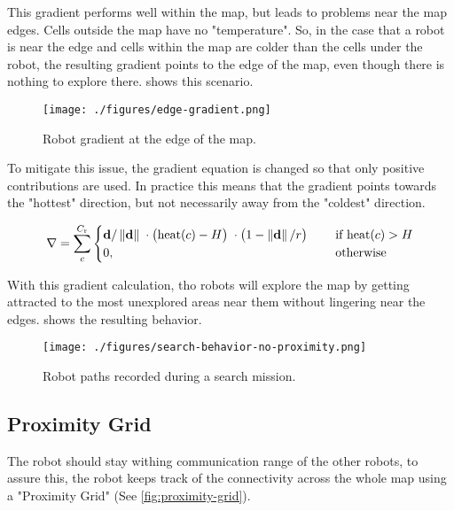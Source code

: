 This gradient performs well within the map, but leads to problems near the map edges. Cells outside the map have no "temperature". {\color{red}So}, in the case that a robot is near the edge and cells within the map are colder than the cells under the robot, the resulting gradient points to the edge of the map, even though there is nothing to explore there.  shows this scenario.

\begin{figure}[h]
    \begin{center}
        \texttt{[image: ./figures/edge-gradient.png]}
    \end{center}
    \caption{Robot gradient at the edge of the map.}
    \label{fig:edge-gradient}
\end{figure}

To mitigate this issue, the gradient equation is changed so that only positive contributions are used. In practice this means that the gradient points towards the "hottest" direction, but not necessarily away from the "coldest" direction.

\begin{equation}
\label{eq:robot-gradient}
    \nabla = \sum_c^{C_\mathrm{r}}
    \begin{cases}
        \mathbf{d}/\left\lVert\mathbf{d}\right\rVert      \; \cdot
        \big(\mathrm{heat}(c) - H\big)    \; \cdot
        \big(1 - \left\lVert\mathbf{d}\right\rVert/r\big) \; \quad &\text{if } \mathrm{heat}(c) > H
        \\
        0, \quad &\text{otherwise}
    \end{cases}
\end{equation}

With this gradient calculation, tho robots will explore the map by getting attracted to the most unexplored areas near them without lingering near the edges.  shows the resulting behavior.

\begin{figure}[h]
    \begin{center}
        \texttt{[image: ./figures/search-behavior-no-proximity.png]}
    \end{center}
    \caption{Robot paths recorded during a search mission.}
    \label{fig:search-no-proximity}
\end{figure}

\subsection{Proximity Grid}
The robot should stay withing communication range of the other robots, to assure this, the robot keeps track of the connectivity {\color{red} across} the whole map using a "Proximity Grid" (See \cref{fig:proximity-grid}).

